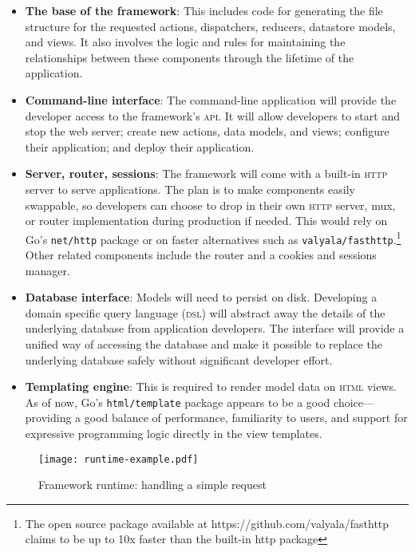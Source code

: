 \documentclass{article}
\begin{document}
\begin{itemize}
    \item \textbf{The base of the framework}: This includes code for generating the file structure for the requested actions, dispatchers, reducers, datastore models, and views. It also involves the logic and rules for maintaining the relationships between these components through the lifetime of the application.
    \item \textbf{Command-line interface}: The command-line application will provide the developer access to the framework's \textsc{api}. It will allow developers to start and stop the web server; create new actions, data models, and views; configure their application; and deploy their application.
    \item \textbf{Server, router, sessions}: The framework will come with a built-in \textsc{http} server to serve applications. The plan is to make components easily swappable, so developers can choose to drop in their own \textsc{http} server, mux, or router implementation during production if needed. This would rely on Go's \texttt{net/http} package or on faster alternatives such as \texttt{valyala/fasthttp}.\footnote{The open source package available at {https://github.com/valyala/fasthttp} claims to be up to 10x faster than the built-in http package} Other related components include the router and a cookies and sessions manager. 
    \item \textbf{Database interface}: Models will need to persist on disk. Developing a domain specific query language (\textsc{dsl}) will abstract away the details of the underlying database from application developers. The interface will provide a unified way of accessing the database and make it possible to replace the underlying database safely without significant developer effort.
    \item \textbf{Templating engine}: This is required to render model data on \textsc{html} views. As of now, Go's \texttt{html/template} package appears to be a good choice---providing a good balance of performance, familiarity to users, and support for expressive programming logic directly in the view templates.
\end{itemize}

\vspace{1em}

\begin{figure}[h]
\centering
\texttt{[image: runtime-example.pdf]}
\caption{Framework runtime: handling a simple request}
\end{figure}
\end{document}
